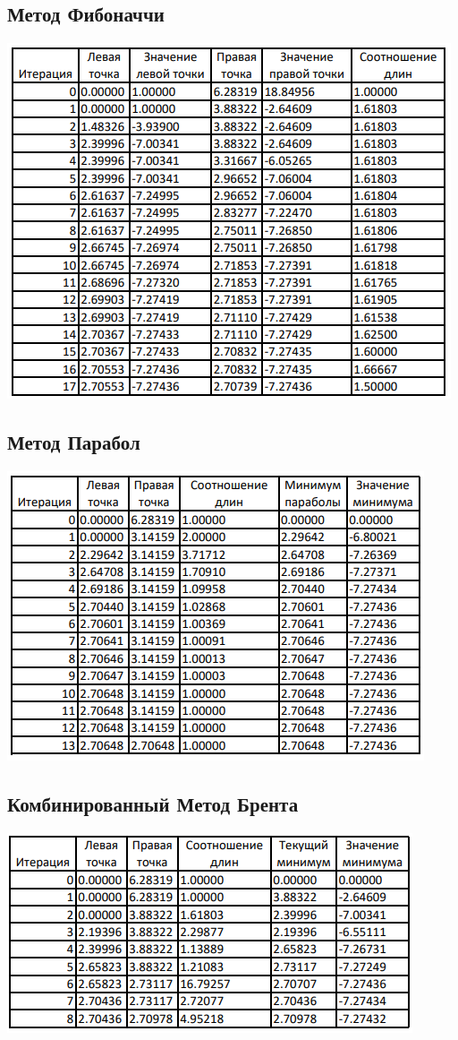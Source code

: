 \documentclass[a4paper,12pt]{article}
\begin{document}
\subsection{Метод Фибоначчи}
\includegraphics[width=\linewidth]{table_fibonacci.PNG}
\clearpage

\subsection{Метод Парабол}
\includegraphics[width=\linewidth]{table_parabola.PNG}
\clearpage

\subsection{Комбинированный Метод Брента}
\includegraphics[width=\linewidth]{table_brent.PNG}
\clearpage
\end{document}
